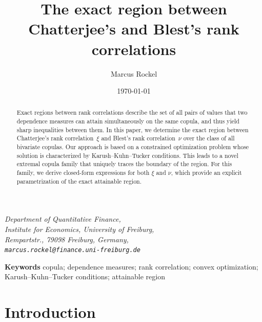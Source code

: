 \documentclass{article}
\title{\textbf{The exact region between Chatterjee's and Blest's rank correlations}}
\author{Marcus Rockel}
\date{\today}
\newcommand{\1}{\mathds{1}}
\providecommand{\keywords}[1]{\textbf{Keywords } #1}
\begin{document}
\maketitle
\begin{center}
	\small\textit{
		Department of Quantitative Finance,\\
		Institute for Economics, University of Freiburg,\\
		Rempartstr., 79098 Freiburg, Germany,\\
        \texttt{marcus.rockel@finance.uni-freiburg.de} \\[2mm]
	}
\end{center}
\begin{abstract}
Exact regions between rank correlations describe the set of all pairs of values that two dependence measures can attain simultaneously on the same copula, and thus yield sharp inequalities between them. 
In this paper, we determine the exact region between Chatterjee's rank correlation~$\xi$ and Blest's rank correlation~$\nu$ over the class of all bivariate copulas. 
Our approach is based on a constrained optimization problem whose solution is characterized by Karush--Kuhn--Tucker conditions. 
This leads to a novel extremal copula family that uniquely traces the boundary of the region. 
For this family, we derive closed-form expressions for both $\xi$ and $\nu$, which provide an explicit parametrization of the exact attainable region.
\end{abstract}
\vspace{0ex}
\keywords{copula; dependence measures; rank correlation; convex optimization; Karush--Kuhn--Tucker conditions; attainable region}


\section{Introduction}
\label{sec:xi-nu-region}
\end{document}
